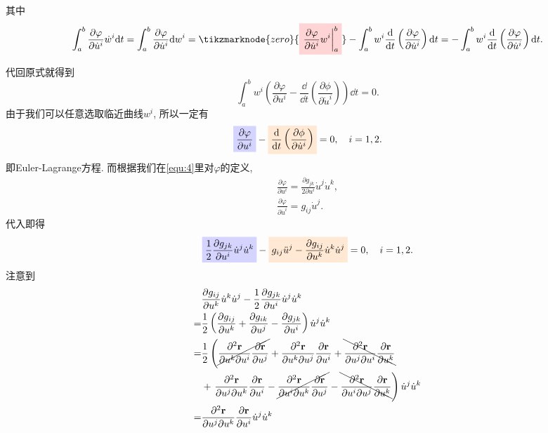 \documentclass[./main.tex]{subfiles}
\begin{document}
其中
\[
    \int_a^b \frac{\partial\varphi}{\partial\dot u^i}\dot w^i\dd t=\int_a^b\frac{\partial\varphi}{\partial\dot u^i}\dd w^i=\tikzmarknode{zero}{\highlight{red}{\displaystyle\left.\frac{\partial\varphi}{\partial\dot u^i}w^i\right|_a^b}}-\int_a^bw^i\frac{\dd}{\dd t}\left(\frac{\partial\varphi}{\partial\dot u^i}\right)\dd t=-\int_a^bw^i\frac{\dd}{\dd t}\left(\frac{\partial\varphi}{\partial\dot u^i}\right)\dd t.
\]
代回原式就得到
\[
    \int_a^bw^i\left(\frac{\partial\varphi}{\partial u^i}-\frac{\dd}{\dd t}\left(\frac{\partial\phi}{\partial\dot u^i}\right)\right)\dd t=0.
\]
由于我们可以任意选取临近曲线\(w^i\), 所以一定有
\[
    \highlight{blue}{\displaystyle\frac{\partial\varphi}{\partial u^i}}-\highlight{orange}{\displaystyle\frac{\dd}{\dd t}\left(\frac{\partial\phi}{\partial\dot u^i}\right)}=0,\quad i=1,2.
\]
即Euler-Lagrange方程. 而根据我们在\eqref{equ:4}里对\(\varphi\)的定义,
\begin{gather*}
    \frac{\partial\varphi}{\partial u^i}=\frac{\partial g_{jk}}{2\partial u^i}\dot u^j\dot u^k,\\
    \frac{\partial\varphi}{\partial\dot u^i}=g_{ij}\dot u^j.
\end{gather*}
代入即得
\[
    \highlight{blue}{\displaystyle\frac12\frac{\partial g_{jk}}{\partial u^i}\dot u^j\dot u^k}-\highlight{orange}{\displaystyle g_{ij}\ddot u^j-\frac{\partial g_{ij}}{\partial u^k}\dot u^k\dot u^j}=0,\quad i=1,2.
\]
注意到
\begin{align*}
    &\frac{\partial g_{ij}}{\partial u^k}\dot u^k\dot u^j-\frac12\frac{\partial g_{jk}}{\partial u^i}\dot u^j\dot u^k\\
    =&\frac{1}{2}\left(\frac{\partial g_{ij}}{\partial u^k}+\frac{\partial g_{ik}}{\partial u^j}-\frac{\partial g_{jk}}{\partial u^i}\right)\dot u^j\dot u^k\\
    =&\frac{1}{2}\left(\cancel{\frac{\partial^2\mathbf{r}}{\partial u^k\partial u^i}\frac{\partial\mathbf{r}}{\partial u^j}}+\frac{\partial^2\mathbf{r}}{\partial u^k\partial u^j}\frac{\partial\mathbf{r}}{\partial u^i}+\bcancel{\frac{\partial^2\mathbf{r}}{\partial u^j\partial u^i}\frac{\partial\mathbf{r}}{\partial u^k}}\right.\\
     &+\left.\frac{\partial^2\mathbf{r}}{\partial u^j\partial u^k}\frac{\partial\mathbf{r}}{\partial u^i}-\cancel{\frac{\partial^2\mathbf{r}}{\partial u^i\partial u^k}\frac{\partial\mathbf{r}}{\partial u^j}}-\bcancel{\frac{\partial^2\mathbf{r}}{\partial u^i\partial u^j}\frac{\partial\mathbf{r}}{\partial u^k}}\right)\dot u^j\dot u^k\\
    =&\frac{\partial^2\mathbf{r}}{\partial u^j\partial u^k}\frac{\partial\mathbf{r}}{\partial u^i}\dot u^j\dot u^k
\end{align*}
\end{document}
